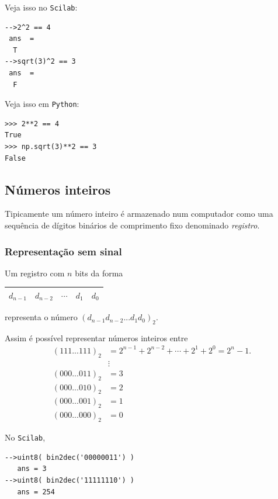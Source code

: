 \ifisscilab
Veja isso no \verb+Scilab+:
\begin{verbatim}
-->2^2 == 4
 ans  =
  T  
-->sqrt(3)^2 == 3
 ans  =
  F  
\end{verbatim}
\fi
\ifispython
Veja isso em \verb+Python+:
\begin{verbatim}
>>> 2**2 == 4
True
>>> np.sqrt(3)**2 == 3
False
\end{verbatim}
\fi

\subsection{Números inteiros}

Tipicamente um número inteiro é armazenado num computador como uma sequência de dígitos binários de comprimento fixo denominado \emph{registro}.

\subsubsection{Representação sem sinal}
Um registro com $n$ bits da forma
 \begin{center}
   \begin{tabular}{|c|c|c|c|c|}\hline
     $d_{n-1}$ & $d_{n-2}$ & $\cdots$ & $d_1$ & $d_0$\\\hline
   \end{tabular}  
 \end{center}
representa o número $(d_{n-1}d_{n-2}...d_1d_0)_2$. 

Assim é possível representar números inteiros entre
\begin{equation*}
\begin{split}
  (111...111)_2 & = 2^{n-1}+2^{n-2}+\cdots+2^1+2^0=2^n-1.\\
                &\vdots\\
  (000...011)_2 &= 3 \\
  (000...010)_2 &= 2 \\
  (000...001)_2 &= 1 \\
  (000...000)_2 & = 0 
\end{split}
\end{equation*}

\ifisscilab
\begin{ex}
  No \verb+Scilab+,
\begin{verbatim}
-->uint8( bin2dec('00000011') )
   ans = 3
-->uint8( bin2dec('11111110') )
   ans = 254
\end{verbatim}
\end{ex}
\fi

